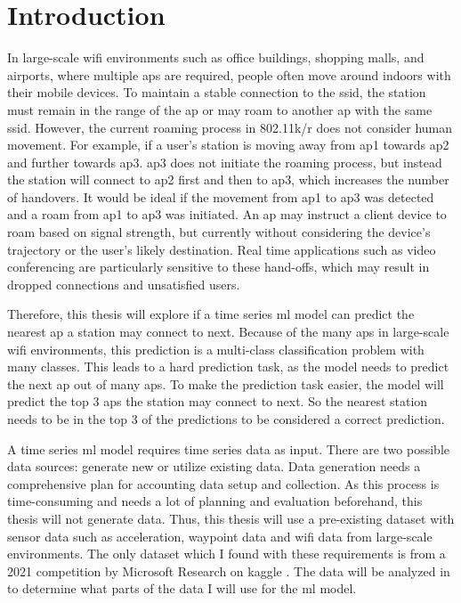 \chapter{Introduction}\label{ch:intro}

In large-scale \ac{wifi} environments such as office buildings, shopping malls, and airports, where multiple \acp{ap} are required, people often move around indoors with their mobile devices.
To maintain a stable connection to the \ac{ssid}, the station must remain in the range of the \ac{ap} or may roam to another \ac{ap} with the same \ac{ssid}.
However, the current roaming process in 802.11k/r\cite{802.11k}\cite{802.11r} does not consider human movement.
For example, if a user's station is moving away from \ac{ap}1 towards \ac{ap}2 and further towards \ac{ap}3.
\ac{ap}3 does not initiate the roaming process, but instead the station will connect to \ac{ap}2 first and then to \ac{ap}3, which increases the number of handovers.
It would be ideal if the movement from \ac{ap}1 to \ac{ap}3 was detected and a roam from \ac{ap}1 to \ac{ap}3 was initiated.
An \ac{ap} may instruct a client device to roam based on signal strength, but currently without considering the device's trajectory or the user's likely destination.
Real time applications such as video conferencing are particularly sensitive to these hand-offs, which may result in dropped connections and unsatisfied users.

Therefore, this thesis will explore if a time series \ac{ml} model can predict the nearest \ac{ap} a station may connect to next.
Because of the many \acp{ap} in large-scale \ac{wifi} environments, this prediction is a multi-class classification problem with many classes.
This leads to a hard prediction task, as the model needs to predict the next \ac{ap} out of many \acp{ap}.
To make the prediction task easier, the model will predict the top 3 \acp{ap} the station may connect to next.
So the nearest station needs to be in the top 3 of the predictions to be considered a correct prediction.

A time series \ac{ml} model requires time series data as input.
There are two possible data sources: generate new or utilize existing data. 
Data generation needs a comprehensive plan for accounting data setup and collection.
As this process is time-consuming and needs a lot of planning and evaluation beforehand, this thesis will not generate data.
Thus, this thesis will use a pre-existing dataset with sensor data such as acceleration, waypoint data and \ac{wifi} data from large-scale environments.
The only dataset which I found with these requirements is from a 2021 competition by Microsoft Research \cite{IndoorLocationNavigation} on kaggle \cite{kaggle}.
The data will be analyzed in  to determine what parts of the data I will use for the \ac{ml} model.

